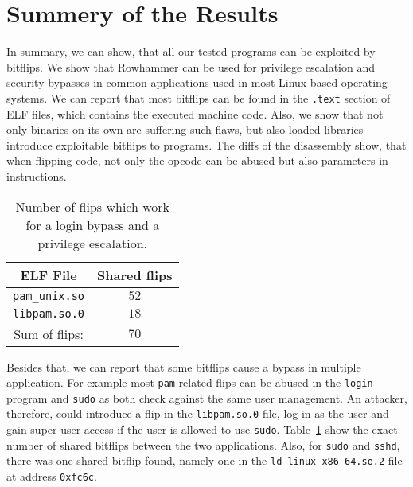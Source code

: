\section{Summery of the Results}

In summary, we can show, that all our tested programs can be exploited by
bitflips. We show that Rowhammer can be used for privilege escalation and
security bypasses in common applications used in most Linux-based operating
systems. We can report that most bitflips can be found in the \texttt{.text}
section of ELF files, which contains the executed machine code. Also, we show
that not only binaries on its own are suffering such flaws, but also loaded
libraries introduce exploitable bitflips to programs. The diffs of the
disassembly show, that when flipping code, not only the opcode can be abused but
also parameters in instructions.

\begin{table}[!htb]
\centering
\begin{tabular}{c|c}
ELF File               & Shared flips \\ \hline
\texttt{pam\_unix.so} & $52$ \\
\texttt{libpam.so.0} & $18$ \\ \hline
Sum of flips:                 & $70$
\end{tabular}
\caption{Number of flips which work for a login bypass and a 
privilege escalation.}
\label{tab:loginsudo}
\end{table}

Besides that, we can report that some bitflips cause a bypass in multiple
application. For example most \texttt{pam} related flips can be abused in the
\texttt{login} program and \texttt{sudo} as both check against the same user
management. An attacker, therefore, could introduce a flip in the
\texttt{libpam.so.0} file, log in as the user and gain super-user access if the
user is allowed to use \texttt{sudo}. Table~\ref{tab:loginsudo} show the exact
number of shared bitflips between the two applications. Also, for \texttt{sudo}
and \texttt{sshd}, there was one shared bitflip found, namely one in the
\texttt{ld-linux-x86-64.so.2} file at address \texttt{0xfc6c}.


